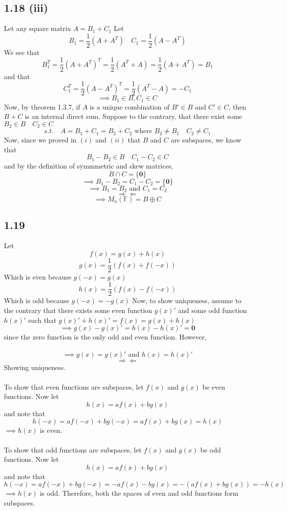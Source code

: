 \documentclass[letterpaper,12pt]{article}
\theoremstyle{definition}
\begin{document}
\subsection*{1.18 (iii)}

Let any square matrix $A = B_1 + C_1$
Let \[B_1 = \frac{1}{2}(A + A^T) \quad C_1 = \frac{1}{2}(A - A^T)\]
We see that \[B_1^T = \frac{1}{2}(A + A^T)^T = \frac{1}{2}(A^T + A) = \frac{1}{2}(A + A^T) = B_1\]
and that \[C_1^T = \frac{1}{2}(A - A^T)^T = \frac{1}{2}(A^T - A) = -C_1\]
\[ \implies  B_1 \in B, C_1 \in C \]
Now, by theorem 1.3.7, if $A$ is a unique combination of $B' \in B$ and $C' \in C$, then $B + C$ is an internal direct sum. Suppose to the contrary, that there exist some $B_2 \in B \quad C_2 \in C$
\[s.t.\quad A = B_1 + C_1 = B_2 + C_2 \text{ where } B_2 \neq B_1 \quad C_2 \neq C_1 \]
Now, since we proved in $(i)$ and $(ii)$ that $B$ and $C$ are subspaces, we know that
\[B_1 - B_2  \in B \quad C_1 - C_2 \in C\] and by the definition of symmmetric and skew matrices,
\[ B  \cap C = \{ \mathbf{0} \}\]
\[ \implies B_1 - B_2  = C_1 - C_2 = \{\mathbf{0} \}\] 
\[ \implies B_1 = B_2 \text{ and } C_1 = C_2 \]
\[\Rightarrow\Leftarrow\]
\[\implies M_n( \mathbb{F} ) = B \oplus C\]

\subsection*{1.19}

Let
\[f(x) = g(x) + h(x)\]
\[g(x) = \frac{1}{2}(f(x) + f(-x))\]
Which is even because $g(-x) = g(x)$
\[h(x) = \frac{1}{2}(f(x) - f(-x))\]
Which is odd because $g(-x) = -g(x)$
Now, to show uniqueness, assume to the contrary that there exists some even function $g(x)'$ and some odd function $h(x)'$ such that $g(x)' + h(x)' = f(x) = g(x) + h(x)$
\[\implies g(x) - g(x)' = h(x) - h(x)' = \mathbf{0} \]
since the zero function is the only odd and even function. However,
\\
\\
\[\implies g(x) = g(x)' \text{ and } h(x) = h(x)'\]
\[\Rightarrow \Leftarrow\]
Showing uniqueness.\\\\
To show that even functions are subspaces, let $f(x)$ and $g(x)$ be even functions. Now let \[h(x) = af(x) + bg(x)\] and note that \[ h(-x) = af(-x) + bg(-x) = af(x) + bg(x) = h(x)\]
$\implies h(x)$ is even.\\\\
To show that odd functions are subspaces, let $f(x)$ and $g(x)$ be odd functions. Now let \[h(x) = af(x) + bg(x)\] and note that \[ h(-x) = af(-x) + bg(-x) = -af(x) - bg(x) = -(af(x) + bg(x)) = -h(x)\]
$\implies h(x)$ is odd.
Therefore, both the spaces of even and odd functions form subspaces.
\end{document}
